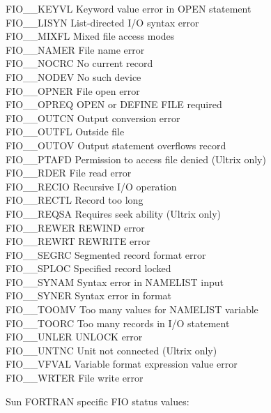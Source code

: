 \begin{tabbing}
FIO\_\_KEYVL \> Keyword value error in OPEN statement \\
FIO\_\_LISYN \> List-directed I/O syntax error \\
FIO\_\_MIXFL \> Mixed file access modes \\
FIO\_\_NAMER \> File name error \\
FIO\_\_NOCRC \> No current record \\
FIO\_\_NODEV \> No such device \\
FIO\_\_OPNER \> File open error \\
FIO\_\_OPREQ \> OPEN or DEFINE FILE required \\
FIO\_\_OUTCN \> Output conversion error \\
FIO\_\_OUTFL \> Outside file \\
FIO\_\_OUTOV \> Output statement overflows record \\
FIO\_\_PTAFD \> Permission to access file denied (Ultrix only) \\
FIO\_\_RDER  \> File read error \\
FIO\_\_RECIO \> Recursive I/O operation \\
FIO\_\_RECTL \> Record too long \\
FIO\_\_REQSA \> Requires seek ability (Ultrix only) \\
FIO\_\_REWER \> REWIND error \\
FIO\_\_REWRT \> REWRITE error \\
FIO\_\_SEGRC \> Segmented record format error \\
FIO\_\_SPLOC \> Specified record locked \\
FIO\_\_SYNAM \> Syntax error in NAMELIST input \\
FIO\_\_SYNER \> Syntax error in format \\
FIO\_\_TOOMV \> Too many values for NAMELIST variable \\
FIO\_\_TOORC \> Too many records in I/O statement \\
FIO\_\_UNLER \> UNLOCK error \\
FIO\_\_UNTNC \> Unit not connected (Ultrix only) \\
FIO\_\_VFVAL \> Variable format expression value error \\
FIO\_\_WRTER \> File write error \\
\end{tabbing}

Sun FORTRAN specific FIO status values:


